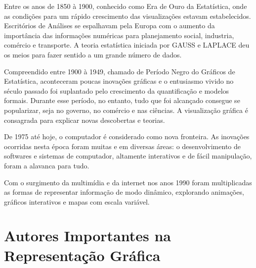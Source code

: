 Entre os anos de 1850 à 1900, conhecido como Era de Ouro da Estatística, onde as condições para um rápido crescimento das visualizações estavam estabelecidos. Escritórios de Análises se espalhavam pela Europa com o aumento da importância das informações numéricas para planejamento social, industria, comércio e transporte. A teoria estatística iniciada por GAUSS e LAPLACE deu os meios para fazer sentido a um grande número de dados.  
\vskip0.3cm 

Compreendido entre 1900 à 1949, chamado de Período Negro do Gráficos de Estatística, aconteceram poucas inovações gráficas e o entusiasmo vivido no século passado foi suplantado pelo crescimento da quantificação e modelos formais. Durante esse período, no entanto, tudo que foi alcançado consegue se popularizar, seja no governo, no comércio e nas ciências. A visualização gráfica é consagrada para explicar novas descobertas e teorias.

\newpage

De 1975 até hoje, o computador é considerado como nova fronteira. As inovações ocorridas nesta época foram muitas e em diversas áreas: o desenvolvimento de softwares e sistemas de computador, altamente interativos e de fácil manipulação, foram a alavanca para tudo.\vskip0.3cm  

Com o surgimento da multimídia e da internet nos anos 1990 foram multiplicadas as formas de representar informação de modo dinâmico, explorando animações, gráficos interativos e mapas com escala variável.

\section{Autores Importantes na Representação Gráfica}


